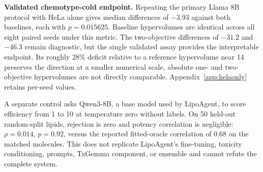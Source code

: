 \documentclass[11pt]{article}
\begin{document}
\textbf{Validated chemotype-cold endpoint.} Repeating the primary Llama 8B protocol with HeLa alone gives median differences of $-3.93$ against both baselines, each with $p=0.015625$. Baseline hypervolumes are identical across all eight paired seeds under this metric. The two-objective differences of $-31.2$ and $-46.3$ remain diagnostic, but the single validated assay provides the interpretable endpoint. Its roughly 28\% deficit relative to a reference hypervolume near 14 preserves the direction at a smaller numerical scale, absolute one- and two-objective hypervolumes are not directly comparable. Appendix~\ref{app:helaonly} retains per-seed values.

A separate control asks Qwen3-8B, a base model used by LipoAgent, to score efficiency from 1 to 10 at temperature zero without labels. On 50 held-out random-split lipids, rejection is zero and potency correlation is negligible: $\rho=0.014$, $p=0.92$, versus the reported fitted-oracle correlation of 0.68 on the matched molecules. This does not replicate LipoAgent's fine-tuning, toxicity conditioning, prompts, TxGemma component, or ensemble and cannot refute the complete system.
\end{document}
